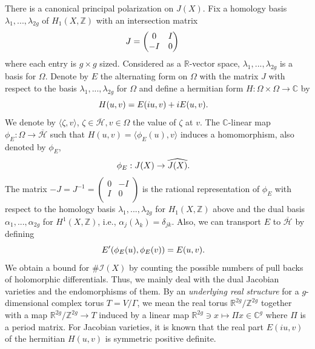 \documentclass[11pt]{article}
\numberwithin{equation}{section}
\theoremstyle{plain}
\begin{document}
 There is a canonical principal polarization on $J(X)$. Fix a homology basis $\lambda_{1},...,\lambda_{2g}$ of $H_{1}(X,\mathbb{Z})$ with an intersection matrix 
\begin{equation*}
J=\begin{pmatrix}0&I\\ -I&0\end{pmatrix} \text{\quad }
\end{equation*}
where each entry is $g\times g$ sized.  Considered as a $\mathbb{R}$-vector space, $\lambda_{1},...,\lambda_{2g}$ is a basis for $\Omega$. Denote by $E$ the alternating form on $\Omega$ with the matrix $J$ with respect to the basis $\lambda_{1},...,\lambda_{2g}$ for $\Omega$ and define a hermitian form $H:\Omega\times\Omega\rightarrow\mathbb{C}$ by 
\begin{equation*}
H(u,v)=E(iu,v)+iE(u,v). \text{\quad }
\end{equation*}
We denote by $\langle\zeta,v\rangle$, $\zeta\in\overline{\mathcal{H}},v\in\Omega$ the value of $\zeta$ at $v$. The $\mathbb{C}$-linear map $\phi_{E}:\Omega\rightarrow\overline{\mathcal{H}}$ such that $H(u,v)=\langle\phi_{E}(u),v\rangle$ induces a homomorphism, also denoted by $\phi_{E}$, 
\begin{equation*}
\phi_{E}:J(X)\rightarrow \widehat{J(X)}. \text{\quad }
\end{equation*}
The matrix $-J=J^{-1}=\begin{pmatrix}0&-I\\ I&0\\ \end{pmatrix}$ is the rational representation of $\phi_{E}$ with respect to the homology basis $\lambda_{1},...,\lambda_{2g}$ for $H_{1}(X,\mathbb{Z})$ above and the dual basis $\alpha_{1},...,\alpha_{2g}$ for $H^{1}(X,\mathbb{Z})$, i.e., $\alpha_{j}(\lambda_{k})=\delta_{jk}.$ Also, we can transport $E$ to $\overline{\mathcal{H}}$ by defining 
\begin{equation*}
E^{\prime}(\phi_{E}(u),\phi_{E}(v))=E(u,v). \text{\quad }
\end{equation*}
We obtain a bound for $\#\mathcal{I}(X)$ by counting the possible numbers of pull backs of holomorphic differentials.  Thus, we mainly deal with the dual Jacobian varieties and the endomorphisms of them.  By an {\it underlying real structure} for a $g$-dimensional complex torus $T=V/\Gamma$, we mean the real torus $\mathbb{R}^{2g}/\mathbb{Z}^{2g}$ together with a map $\mathbb{R}^{2g}/\mathbb{Z}^{2g}\rightarrow T$ induced by a linear map $\mathbb{R}^{2g}\ni x\mapsto\Pi x\in\mathbb{C}^{g}$ where $\Pi$ is a period matrix.  For Jacobian varieties, it is known that the real part $E(iu,v)$ of the hermitian $H(u,v)$ is 
symmetric positive definite. 
\end{document}
